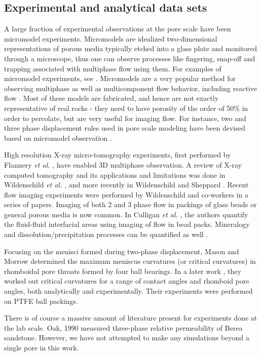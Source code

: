 \subsection{Experimental and analytical data sets}

A large fraction of experimental observations at the pore scale have been micromodel experiments. Micromodels are idealized two-dimensional representations of porous media typically etched into a glass plate and monitored through a microscope, thus one can observe processes like fingering, snap-off and trapping associated with multiphase flow using them. For examples of micromodel experiments, see \cite{lenormand1989flow,lenormand1988numerical, lenormand1985invasion, mckellar1982method, soll1993micromodel}. Micromodels are a very popular method for observing multiphase as well as multicomponent flow behavior, including reactive flow \cite{corapcioglu1999glass, willingham2008evaluation}. Most of these models are fabricated, and hence are not exactly representative of real rocks - they need to have porosity of the order of 50\% in order to percolate, but are very useful for imaging flow. For instance, two and three phase displacement rules used in pore scale modeling have been devised based on micromodel observation \cite{oren_fluid_1995}.

High resolution X-ray micro-tomography experiments, first performed by Flannery \emph{et al.} \cite{flannery_three-dimensional_1987}, have enabled 3D multiphase observation. A review of X-ray computed tomography and its applications and limitations was done in Wildenschild \emph{et al.} \cite{wildenschild2002using}, and more recently in Wildenschild and Sheppard \cite{wildenschild2013x}. Recent flow imaging experiments were performed by Wildenschild and co-workers in a series of papers. Imaging of both 2 and 3 phase flow in packings of glass beads or general porous media is now common\cite{wildenschild_quantitative_2005, herring_effect_2013, piri_three-dimensional_2005, prodanovic_porous_2006}. In Culligan \emph{et al.} \cite{culligan_interfacial_2004}, the authors quantify the fluid-fluid interfacial areas using imaging of flow in bead packs. Mineralogy and dissolution/precipitation processes can be quantified as well \cite{cai2009tomographic}.

Focusing on the menisci formed during two-phase displacement, Mason and Morrow \cite{mason1986meniscus} determined the maximum meniscus curvatures (or critical curvatures) in rhomboidal pore throats formed by four ball bearings. In a later work \cite{mason_effect_1994}, they worked out critical curvatures for a range of contact angles and rhomboid pore angles, both analytically and experimentally. Their experiments were performed on PTFE ball packings.

There is of course a massive amount of literature present for experiments done at the lab scale\cite{homsy1987viscous, ingham2005transport, van1976mass}. Oak, 1990 \cite{oak1990three} measured three-phase relative permeability of Berea sandstone. However, we have not attempted to make any simulations beyond a single pore in this work.



